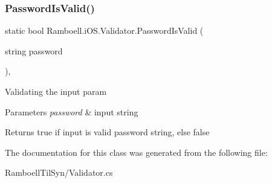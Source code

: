 \subsubsection{\texorpdfstring{Password\+Is\+Valid()}{PasswordIsValid()}}
{\footnotesize\ttfamily static bool Ramboell.\+i\+O\+S.\+Validator.\+Password\+Is\+Valid (\begin{DoxyParamCaption}\item[{string}]{password }\end{DoxyParamCaption})\hspace{0.3cm}{\ttfamily [inline]}, {\ttfamily [static]}}



Validating the input param 


\begin{DoxyParams}{Parameters}
{\em password} & input string\\
\hline
\end{DoxyParams}
\begin{DoxyReturn}{Returns}
true if input is valid password string, else false
\end{DoxyReturn}


The documentation for this class was generated from the following file\+:\begin{DoxyCompactItemize}
\item 
Ramboell\+Til\+Syn/Validator.\+cs\end{DoxyCompactItemize}
